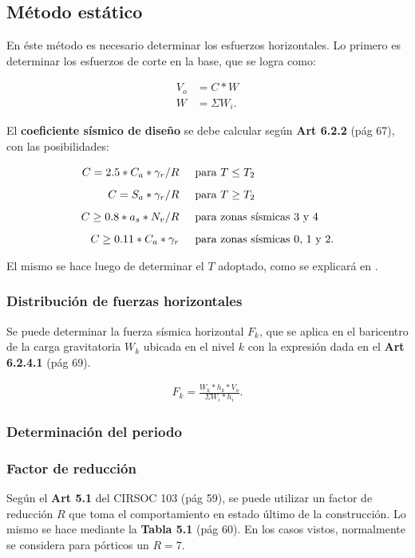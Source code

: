\documentclass[../main.tex]{subfiles}
\begin{document}
\subsection{Método estático}

En éste método es necesario determinar los esfuerzos horizontales. Lo primero
es determinar los esfuerzos de corte en la base, que se logra como:

\begin{align*}
  V_o &=  C * W \\[5pt] 
  W &= \Sigma W_i
.\end{align*}

El \textbf{coeficiente sísmico de diseño} se debe calcular según \textbf{Art 6.2.2}
(pág 67), con las posibilidades:

\begin{align*}
  C = 2.5 * C_a * \gamma_r / R \hspace{0.5cm} &\text{para } T \leq T_2 \\[5pt]
  C = S_a * \gamma_r / R \hspace{0.5cm} &\text{para } T \geq T_2 \\[5pt]
  C \geq 0.8 * a_s * N_v / R \hspace{0.5cm}&\text{para zonas sísmicas 3 y 4}  \\[5pt]
  C \geq  0.11 * C_a * \gamma_r \hspace{0.5cm} &\text{para zonas sísmicas 0, 1 y 2}
.\end{align*}

El mismo se hace luego de determinar el $T$ adoptado, como se explicará en
.


\subsubsection{Distribución de fuerzas horizontales}

Se puede determinar la fuerza sísmica horizontal $F_k$, que se aplica en el
baricentro de la carga gravitatoria $W_k$ ubicada en el nivel $k$ con la
expresión dada en el  \textbf{Art 6.2.4.1} (pág 69).

\begin{align*}
  F_k = \frac{W_k * h_k * V_o}{\Sigma W_i * h_i}
.\end{align*}

\subsubsection{Determinación del periodo}\label{periodo}



\subsubsection{Factor de reducción}

Según el \textbf{Art 5.1} del CIRSOC 103 (pág 59), se puede utilizar un factor
de reducción $R$ que toma el comportamiento en estado último de la construcción.
Lo mismo se hace mediante la  \textbf{Tabla 5.1} (pág 60). En los casos vistos,
normalmente se considera para pórticos un $R=7$.
\end{document}
